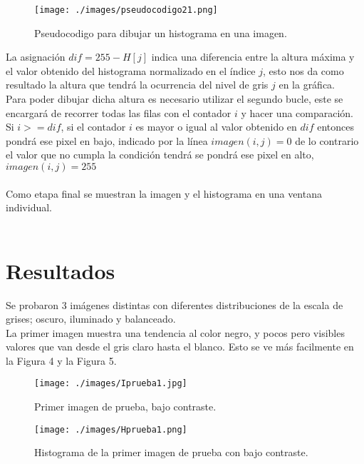 \documentclass[conference]{IEEEtran}
\begin{document}
\begin{figure}[h]
	\begin{center}
		\setlength{\unitlength}{0.00105in}
		\texttt{[image: ./images/pseudocodigo21.png]}
	\end{center}
	\caption{Pseudocodigo para dibujar un histograma en una imagen.}
\end{figure}

La asignaci\'on $dif = 255-H[j]$ indica una diferencia entre la altura m\'axima y el valor obtenido del histograma normalizado en el \'indice $j$, esto nos da como resultado la altura que tendr\'a la ocurrencia del nivel de gris $j$ en la gr\'afica.\\ Para poder dibujar dicha altura es necesario utilizar el segundo bucle, este se encargar\'a de recorrer todas las filas con el contador $i$ y hacer una comparaci\'on. Si $i >= dif$, si el contador $i$ es mayor o igual al valor obtenido en $dif$ entonces pondr\'a ese pixel en bajo, indicado por la l\'inea $imagen(i,j)=0$ de lo contrario el valor que no cumpla la condici\'on tendr\'a se pondr\'a ese pixel en alto, $imagen(i,j)=255$\\\\
Como etapa final se muestran la imagen y el histograma en una ventana individual.\\\\

\section{Resultados}
Se probaron 3 im\'agenes distintas con diferentes distribuciones de la escala de grises; oscuro, iluminado y balanceado.\\
La primer imagen muestra una tendencia al color negro, y pocos pero visibles valores que van desde el gris claro hasta el blanco. Esto se ve m\'as facilmente en la Figura 4 y la Figura 5.

\begin{figure}[h]
	\begin{center}
		\setlength{\unitlength}{0.00105in}
		\texttt{[image: ./images/Iprueba1.jpg]}
	\end{center}
	\caption{Primer imagen de prueba, bajo contraste.}
\end{figure}

\begin{figure}[h]
	\begin{center}
		\setlength{\unitlength}{0.00105in}
		\texttt{[image: ./images/Hprueba1.png]}
	\end{center}
	\caption{Histograma de la primer imagen de prueba con bajo contraste.}
\end{figure}
\end{document}
